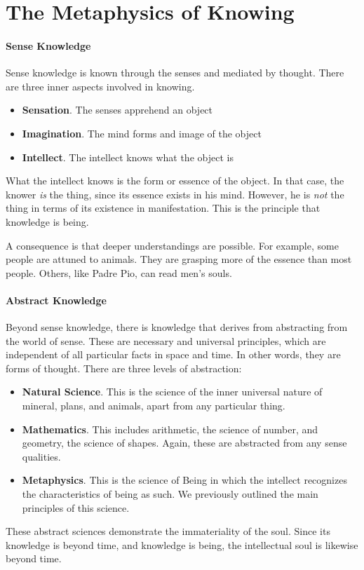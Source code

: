\section{The Metaphysics of Knowing}

\paragraph{Sense Knowledge}
Sense knowledge is known through the senses and mediated by thought. There are three inner aspects involved in knowing.

\begin{itemize}
\item \textbf{Sensation}. The senses apprehend an object 
\item \textbf{Imagination}. The mind forms and image of the object 
\item \textbf{Intellect}. The intellect knows what the object is 
\end{itemize}
What the intellect knows is the form or essence of the object. In that case, the knower \emph{is} the thing, since its essence exists in his mind. However, he is \emph{not} the thing in terms of its existence in manifestation. This is the principle that knowledge is being.

A consequence is that deeper understandings are possible. For example, some people are attuned to animals. They are grasping more of the essence than most people. Others, like Padre Pio, can read men's souls.

\paragraph{Abstract Knowledge}
Beyond sense knowledge, there is knowledge that derives from abstracting from the world of sense. These are necessary and universal principles, which are independent of all particular facts in space and time. In other words, they are forms of thought. There are three levels of abstraction:

\begin{itemize}
\item \textbf{Natural Science}. This is the science of the inner universal nature of mineral, plans, and animals, apart from any particular thing. 
\item \textbf{Mathematics}. This includes arithmetic, the science of number, and geometry, the science of shapes. Again, these are abstracted from any sense qualities. 
\item \textbf{Metaphysics}. This is the science of Being in which the intellect recognizes the characteristics of being as such. We previously outlined the main principles of this science. 
\end{itemize}
These abstract sciences demonstrate the immateriality of the soul. Since its knowledge is beyond time, and knowledge is being, the intellectual soul is likewise beyond time.


